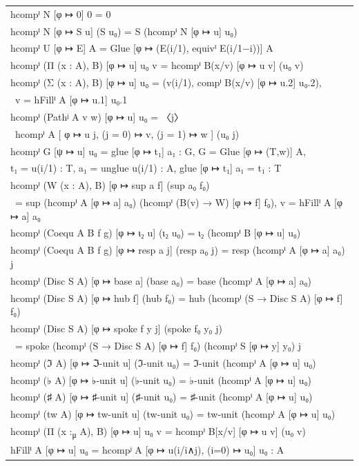 \documentclass[a4paper,UKenglish,cleveref, autoref, thm-restate]{lipics-v2021}
\begin{document}
\begin{table}[ht!]
\begin{tabular}{l}
hcompⁱ N [φ ↦ 0] 0 = 0 \\
hcompⁱ N [φ ↦ S u] (S u₀) = S (hcompⁱ N [φ ↦ u] u₀) \\
hcompⁱ U [φ ↦ E] A = Glue [φ ↦ (E(i/1), equivⁱ E(i/1−i))] A \\
hcompⁱ (Π (x : A), B) [φ ↦ u] u₀ v = hcompⁱ B(x/v) [φ ↦ u v] (u₀ v) \\
hcompⁱ (Σ (x : A), B) [φ ↦ u] u₀ = (v(i/1), compⁱ B(x/v) [φ ↦ u.2] u₀.2), \\
\ v = hFillⁱ A [φ ↦ u.1] u₀.1 \\
hcompⁱ (Pathʲ A v w) [φ ↦ u] u₀ = 〈j〉\\
\ hcompⁱ A [ φ ↦ u j, (j = 0) ↦ v, (j = 1) ↦ w ] (u₀ j) \\
hcompⁱ G [ψ ↦ u] u₀ = glue [φ ↦ t₁] a₁ : G, G = Glue [φ ↦ (T,w)] A, \\
t₁ = u(i/1) : T, a₁ = unglue u(i/1) : A, glue [φ ↦ t₁] a₁ = t₁ : T \\
hcompⁱ (W (x : A), B) [φ ↦ sup a f] (sup a₀ f₀) \\
\ = sup (hcompⁱ A [φ ↦ a] a₀) (hcompⁱ (B(v) → W) [φ ↦ f] f₀), v = hFillⁱ A [φ ↦ a] a₀ \\
hcompⁱ (Coequ A B f g) [φ ↦ ι₂ u] (ι₂ u₀) = ι₂ (hcompⁱ B [φ ↦ u] u₀) \\
hcompⁱ (Coequ A B f g) [φ ↦ resp a j] (resp a₀ j) = resp (hcompⁱ A [φ ↦ a] a₀) j \\
hcompⁱ (Disc S A) [φ ↦ base a] (base a₀) = base (hcompⁱ A [φ ↦ a] a₀) \\
hcompⁱ (Disc S A) [φ ↦ hub f] (hub f₀) = hub (hcompⁱ (S → Disc S A) [φ ↦ f] f₀) \\
hcompⁱ (Disc S A) [φ ↦ spoke f y j] (spoke f₀ y₀ j) \\
\ = spoke (hcompⁱ (S → Disc S A) [φ ↦ f] f₀) (hcompⁱ S [φ ↦ y] y₀) j \\
hcompⁱ (ℑ A) [φ ↦ ℑ-unit u] (ℑ-unit u₀) = ℑ-unit (hcompⁱ A [φ ↦ u] u₀) \\
hcompⁱ (♭ A) [φ ↦ ♭-unit u] (♭-unit u₀) = ♭-unit (hcompⁱ A [φ ↦ u] u₀) \\
hcompⁱ (♯ A) [φ ↦ ♯-unit u] (♯-unit u₀) = ♯-unit (hcompⁱ A [φ ↦ u] u₀) \\
hcompⁱ (tw A) [φ ↦ tw-unit u] (tw-unit u₀) = tw-unit (hcompⁱ A [φ ↦ u] u₀) \\
hcompⁱ (Π (x :\textsubscript{μ} A), B) [φ ↦ u] u₀ v = hcompⁱ B[x/v] [φ ↦ u v] (u₀ v) \\
hFillⁱ A [φ ↦ u] u₀ = hcompʲ A [φ ↦ u(i/i∧j), (i=0) ↦ u₀] u₀ : A \\
\end{tabular}
\end{table}
\end{document}

